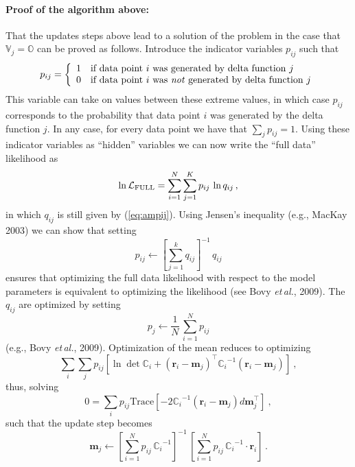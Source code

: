 \documentclass[12pt]{article}
\newcommand{\etal}{\emph{et\,al.}}
\newcommand{\eg}{e.g.}
\newcommand{\Mvector}[1]{\boldsymbol{#1}}
\newcommand{\measurement}{\Mvector{r}}
\newcommand{\measurementi}{\measurement_i}
\newcommand{\mean}{\Mvector{m}}
\newcommand{\meanj}{\mean_j}
\newcommand{\lnlikefull}{\ln\mathcal{L}_{\mbox{{\scriptsize FULL}}}}
\newcommand{\ampj}{p_j}
\newcommand{\ampij}{q_{ij}}
\newcommand{\normampij}{p_{ij}}
\newcommand{\Mmatrix}[1]{\mathbb{#1}}
\newcommand{\varj}{\Mmatrix{V}_j}
\newcommand{\covari}{\Mmatrix{C}_i}
\newcommand{\zero}{\Mmatrix{O}}
\newcommand{\inverse}[1]{{#1}^{-1}}
\newcommand{\invcovari}{\inverse{\covari}}
\newcommand{\T}{^{\scriptscriptstyle \top}}   %
\newcommand{\trace}{\mathrm{Trace}}
\begin{document}
\paragraph{Proof of the algorithm above:}
That the updates steps above lead to a solution of the problem in the case
that $\varj=\zero$ can be proved as follows. Introduce the indicator
variables $\normampij$ such that
\begin{equation}
\normampij = \left\{
\begin{array}{rl}
1 & \text{if data point $i$ was generated by delta function $j$}\\
0 & \text{if data point $i$ was \emph{not} generated by delta function $j$}\\
\end{array} \right.
\end{equation}
This variable can take on values between these extreme values, in
which case $\normampij$ corresponds to the probability that data point
$i$ was generated by the delta function $j$. In any case, for every
data point we have that $\sum_j \normampij = 1$. Using these indicator
variables as ``hidden'' variables we can now write the ``full data''
likelihood as
\begin{equation}
\lnlikefull = \sum_{i=1}^N \sum_{j=1}^K \normampij\,\ln \ampij\, ,
\end{equation}
in which $\ampij$ is still given by (\ref{eq:ampij}). Using Jensen's
inequality (\eg, MacKay 2003) we can show that setting
\begin{equation}
\normampij \leftarrow \inverse{\left[
  \sum_{j=1}^k\ampij
\right]}\,\ampij
\end{equation}
ensures that optimizing the full data likelihood with respect to the
model parameters is equivalent to optimizing the likelihood (see Bovy
\etal, 2009). The $\ampij$ are optimized by setting
\begin{equation}
\ampj \leftarrow \frac{1}{N}\,\sum_{i=1}^N\normampij
\end{equation}
(\eg, Bovy \etal, 2009). Optimization of the mean reduces to optimizing
\begin{equation}
\sum_i \sum_j \normampij \left[\ln \det \covari + (\measurementi-\meanj)\T\invcovari (\measurementi - \meanj)\right] \ ,
\end{equation}
thus, solving
\begin{equation}
0 = \sum_i \normampij \trace\left[ - 2 \invcovari (\measurementi - \meanj) d \meanj\T \right] \ ,
\end{equation}
such that the update step becomes
\begin{equation}
\meanj \leftarrow \inverse{\left[
  \sum_{i=1}^N\normampij\,\invcovari
\right]}\,\left[
  \sum_{i=1}^N\normampij\,\invcovari\cdot\measurementi
\right]\, .
\end{equation}
\end{document}
